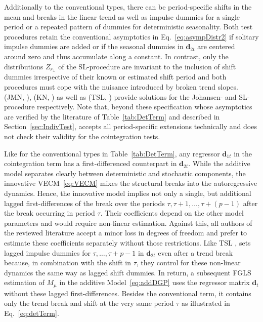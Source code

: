 Additionally to the conventional types, there can be period-specific shifts in the mean and breaks in the linear trend as well as impulse dummies for a single period or a repeated pattern of dummies for deterministic seasonality. Both test procedures retain the conventional asymptotics in Eq.~\eqref{eq:asympDistr2} if solitary impulse dummies are added or if the seasonal dummies in $ \boldsymbol{d}_{2t} $ are centered around zero and thus accumulate along a constant. In contrast, only the distributions $ Z_{r_\perp} $ of the SL-procedure are invariant to the inclusion of shift dummies irrespective of their known or estimated shift period and both procedures must cope with the nuisance introduced by broken trend slopes. \citeauthor*{JohansenEtAl2000} (JMN, \citeyear{JohansenEtAl2000}), \citeauthor*{KuritaNielsen2019} (KN, \citeyear{KuritaNielsen2019}) as well as \citeauthor*{TrenklerEtAl2008} (TSL, \citeyear{TrenklerEtAl2008}) provide solutions for the Johansen- and SL-procedure respectively. Note that, beyond these specification whose asymptotics are verified by the literature of Table~\ref{tab:DetTerm} and described in Section~\ref{sec:IndivTest},  accepts all period-specific extensions technically and does not check their validity for the cointegration tests.

Like for the conventional types in Table~\ref{tab:DetTerm}, any regressor $ \boldsymbol{d}_{1t} $ in the cointegration term has a first-differenced counterpart in $ \boldsymbol{d}_{2t} $. While the additive model separates clearly between deterministic and stochastic components, the innovative VECM~\eqref{eq:VECM} mixes the structural breaks into the autoregressive dynamics. Hence, the innovative model implies not only a single, but additional lagged first-differences of the break over the periods $ \tau, \tau+1, \ldots, \tau+(p-1) $ after the break occurring in period $ \tau $. Their coefficients depend on the other model parameters and would require non-linear estimation. Against this, all authors of the reviewed literature accept a minor loss in degrees of freedom and prefer to estimate these coefficients separately without those restrictions. Like TSL \citeyearpar[p.~335]{TrenklerEtAl2008},  sets lagged impulse dummies for $ \tau, \ldots, \tau+p-1 $ in $ \boldsymbol{d}_{2t} $ even after a trend break because, in combination with the shift in $ \tau $, they control for these non-linear dynamics the same way as lagged shift dummies. In return, a subsequent FGLS estimation of $ M_\mu $ in the additive Model~\eqref{eq:addDGP} uses the regressor matrix $ \boldsymbol{d}_t $ without these lagged first-differences. Besides the conventional term, it contains only the trend break and shift at the very same period $ \tau $ as illustrated in Eq.~\eqref{eq:detTerm}.


